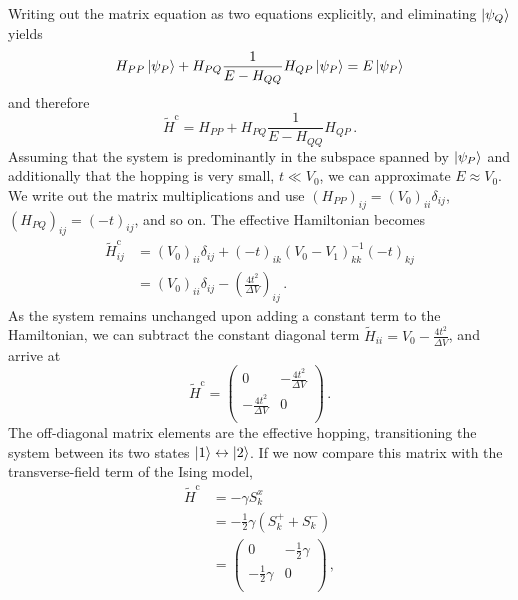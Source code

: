 %
Writing out the matrix equation as two equations explicitly, and eliminating
$\left|\psi_Q\right>$ yields 
%
\begin{equation}
  H_{PP} \left|\psi_P\right> + H_{PQ} \frac{1}{E - H_{QQ}} H_{QP} \left|\psi_P\right>
  =
  E \left|\psi_P\right>
\end{equation}
%
and therefore
%
\begin{equation}
  \label{eq:H_effective}
  \tilde{H}^\text{c} = H_{PP} + H_{PQ} \frac{1}{E - H_{QQ}} H_{QP} \, .
\end{equation}
%
Assuming that the system is predominantly in the subspace spanned by
$\left|\psi_P\right>$ and additionally that the hopping is very small, $t \ll V_0$, we
can approximate $E \approx V_0$. We write out the matrix multiplications and use
$\left( H_{PP} \right)_{ij} = \left( V_0 \right)_{ii} \delta_{ij}$, $\left(
H_{PQ} \right)_{ij} = \left( -t \right)_{ij}$, and so on. The effective
Hamiltonian becomes
%
\begin{equation}
\begin{split}
  \tilde{H}^\text{c}_{ij}
  &=
  \left( V_0 \right)_{ii} \delta_{ij}
  + \left( - t \right)_{ik}
    \left( V_0 - V_1 \right)^{-1}_{kk}
    \left( - t \right)_{kj} \\
  &=
  \left( V_0 \right)_{ii} \delta_{ij}
  - \left( \frac{4 t^2}{\Delta V} \right)_{ij} \, .
\end{split}
\end{equation}
%
As the system remains unchanged upon adding a constant term to the Hamiltonian,
we can subtract the constant diagonal term $\tilde{H}_{ii} = V_0 - \frac{4
t^2}{\Delta V}$, and arrive at
%
\begin{equation}
  \tilde{H}^\text{c}
  =
  \begin{pmatrix}
    0 & - \frac{4 t^2}{\Delta V} \\
    - \frac{4 t^2}{\Delta V} & 0 \\
  \end{pmatrix} \, .
\end{equation}
%
The off-diagonal matrix elements are the effective hopping, transitioning the
system between its two states $\left|1\right> \leftrightarrow \left|2\right>$. If we now
compare this matrix with the transverse-field term of the Ising model,
%
\begin{equation}
\begin{split}
  \tilde{H}^\text{c}
  &=
  - \gamma S^x_k \\
  &=
  - \frac{1}{2} \gamma \left( S^+_k + S^-_k \right) \\[0.5em]
  &= 
  \begin{pmatrix}
    0 & - \frac{1}{2} \gamma \\
    - \frac{1}{2} \gamma & 0 \\
  \end{pmatrix} \, ,
\end{split}
\end{equation}
